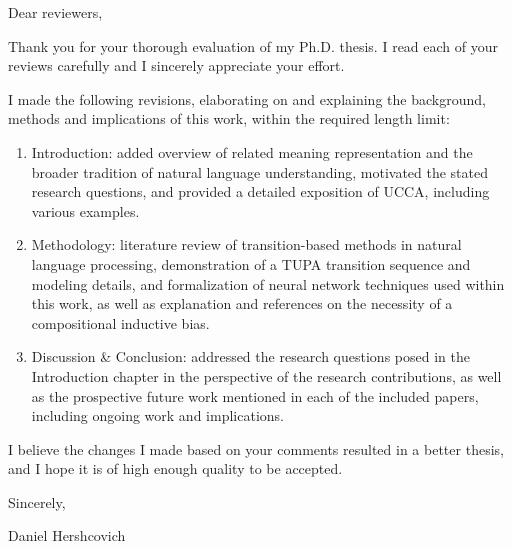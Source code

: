 \documentclass[12pt]{letter}
\begin{document}
Dear reviewers,

Thank you for your thorough evaluation of my Ph.D. thesis.
I read each of your reviews carefully and I sincerely appreciate your effort.

I made the following revisions, elaborating on and explaining the
background, methods and implications of this work, within the required length limit:
\begin{enumerate}
\item Introduction: added overview of related meaning representation and the broader
tradition of natural language understanding, motivated the stated research questions,
and provided a detailed exposition of UCCA, including various examples.
\item Methodology: literature review of transition-based methods in natural language
processing, demonstration of a TUPA transition sequence and modeling details,
and formalization of neural network techniques used within this work,
as well as explanation and references on the necessity of a compositional inductive bias.
\item Discussion \& Conclusion: addressed the research questions posed in the Introduction
chapter in the perspective of the research contributions,
as well as the prospective future work mentioned in each of the included papers,
including ongoing work and implications.
\end{enumerate}

I believe the changes I made based on your comments resulted in a better thesis,
and I hope it is of high enough quality to be accepted.

Sincerely,

Daniel Hershcovich
\end{document}
